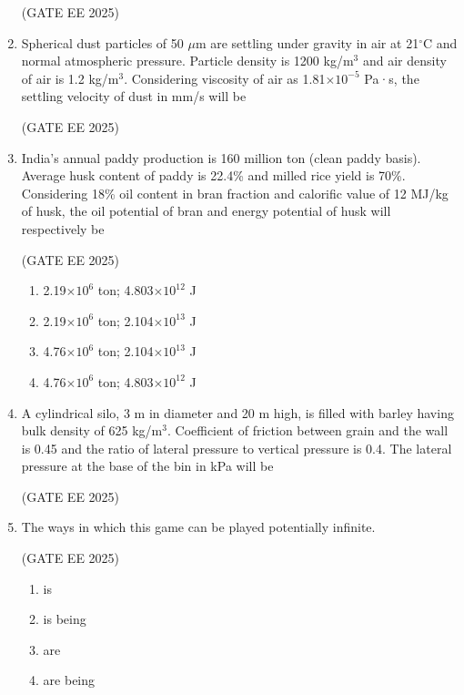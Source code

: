 \documentclass[journal,12pt,onecolumn]{IEEEtran}
\theoremstyle{remark}
\begin{document}
\begin{enumerate}
\hfill(GATE EE 2025)

\item Spherical dust particles of 50 $\mu$m are settling under gravity in air at 21$^\circ$C and normal atmospheric pressure. Particle density is 1200 kg/m$^3$ and air density of air is 1.2 kg/m$^3$. Considering viscosity of air as 1.81$\times 10^{-5}$ Pa·s, the settling velocity of dust in mm/s will be \underline{\hspace{2cm}}

\hfill(GATE EE 2025)

\item India's annual paddy production is 160 million ton (clean paddy basis). Average husk content of paddy is 22.4\% and milled rice yield is 70\%. Considering 18\% oil content in bran fraction and calorific value of 12 MJ/kg of husk, the oil potential of bran and energy potential of husk will respectively be

\hfill(GATE EE 2025)

\begin{multicols}{2}
    \begin{enumerate}
     \item 2.19$\times 10^6$ ton; 4.803$\times 10^{12}$ J  
     \item 2.19$\times 10^6$ ton; 2.104$\times 10^{13}$ J  
     \item 4.76$\times 10^6$ ton; 2.104$\times 10^{13}$ J  
     \item 4.76$\times 10^6$ ton; 4.803$\times 10^{12}$ J  
    \end{enumerate}
\end{multicols}

\item A cylindrical silo, 3 m in diameter and 20 m high, is filled with barley having bulk density of 625 kg/m$^3$. Coefficient of friction between grain and the wall is 0.45 and the ratio of lateral pressure to vertical pressure is 0.4. The lateral pressure at the base of the bin in kPa will be \underline{\hspace{2cm}} 

\hfill(GATE EE 2025)
\newpage
\item The ways in which this game can be played \underline{\hspace{2cm}} potentially infinite. 

\hfill(GATE EE 2025)

\begin{multicols}{4}
    \begin{enumerate}
        \item is
        \item is being
        \item are
        \item are being
    \end{enumerate}
\end{multicols}


\end{enumerate}
\end{document}
